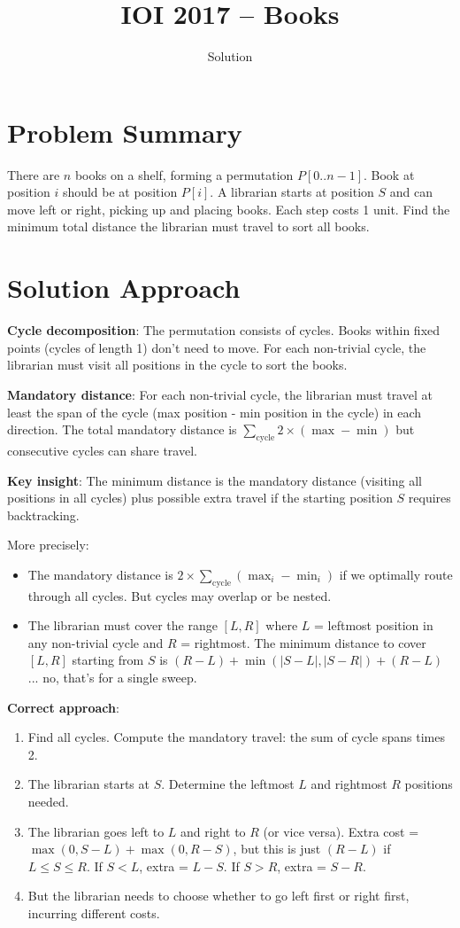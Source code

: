 \documentclass[11pt,a4paper]{article}
\title{IOI 2017 -- Books}
\author{Solution}
\date{}
\begin{document}
\maketitle

\section{Problem Summary}

There are $n$ books on a shelf, forming a permutation $P[0..n-1]$. Book at position $i$ should be at position $P[i]$. A librarian starts at position $S$ and can move left or right, picking up and placing books. Each step costs 1 unit. Find the minimum total distance the librarian must travel to sort all books.

\section{Solution Approach}

\textbf{Cycle decomposition}: The permutation consists of cycles. Books within fixed points (cycles of length 1) don't need to move. For each non-trivial cycle, the librarian must visit all positions in the cycle to sort the books.

\textbf{Mandatory distance}: For each non-trivial cycle, the librarian must travel at least the span of the cycle (max position - min position in the cycle) in each direction. The total mandatory distance is $\sum_{\text{cycle}} 2 \times (\max - \min)$ but consecutive cycles can share travel.

\textbf{Key insight}: The minimum distance is the mandatory distance (visiting all positions in all cycles) plus possible extra travel if the starting position $S$ requires backtracking.

More precisely:
\begin{itemize}
  \item The mandatory distance is $2 \times \sum_{\text{cycle}} (\max_i - \min_i)$ if we optimally route through all cycles. But cycles may overlap or be nested.
  \item The librarian must cover the range $[L, R]$ where $L$ = leftmost position in any non-trivial cycle and $R$ = rightmost. The minimum distance to cover $[L, R]$ starting from $S$ is $(R - L) + \min(|S - L|, |S - R|) + (R - L)$... no, that's for a single sweep.
\end{itemize}

\textbf{Correct approach}:
\begin{enumerate}
  \item Find all cycles. Compute the mandatory travel: the sum of cycle spans times 2.
  \item The librarian starts at $S$. Determine the leftmost $L$ and rightmost $R$ positions needed.
  \item The librarian goes left to $L$ and right to $R$ (or vice versa). Extra cost = $\max(0, S - L) + \max(0, R - S)$, but this is just $(R - L)$ if $L \le S \le R$. If $S < L$, extra = $L - S$. If $S > R$, extra = $S - R$.
  \item But the librarian needs to choose whether to go left first or right first, incurring different costs.
\end{enumerate}
\end{document}
